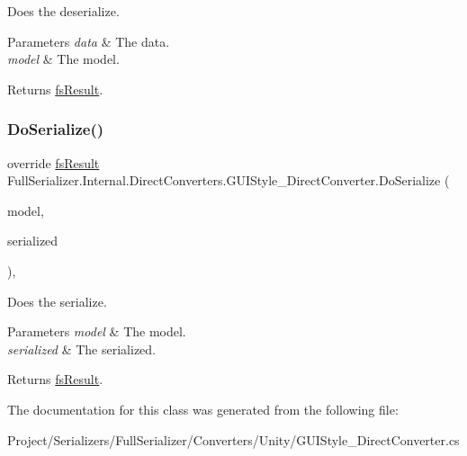 Does the deserialize. 


\begin{DoxyParams}{Parameters}
{\em data} & The data.\\
\hline
{\em model} & The model.\\
\hline
\end{DoxyParams}
\begin{DoxyReturn}{Returns}
\hyperlink{struct_full_serializer_1_1fs_result}{fs\+Result}.
\end{DoxyReturn}
\mbox{\label{class_full_serializer_1_1_internal_1_1_direct_converters_1_1_g_u_i_style___direct_converter_aad30e70d6777a78e62406c4072e45eac}} 
\subsubsection{\texorpdfstring{Do\+Serialize()}{DoSerialize()}}
{\footnotesize\ttfamily override \hyperlink{struct_full_serializer_1_1fs_result}{fs\+Result} Full\+Serializer.\+Internal.\+Direct\+Converters.\+G\+U\+I\+Style\+\_\+\+Direct\+Converter.\+Do\+Serialize (\begin{DoxyParamCaption}\item[{G\+U\+I\+Style}]{model,  }\item[{Dictionary$<$ string, \hyperlink{class_full_serializer_1_1fs_data}{fs\+Data} $>$}]{serialized }\end{DoxyParamCaption})\hspace{0.3cm}{\ttfamily [inline]}, {\ttfamily [protected]}}



Does the serialize. 


\begin{DoxyParams}{Parameters}
{\em model} & The model.\\
\hline
{\em serialized} & The serialized.\\
\hline
\end{DoxyParams}
\begin{DoxyReturn}{Returns}
\hyperlink{struct_full_serializer_1_1fs_result}{fs\+Result}.
\end{DoxyReturn}


The documentation for this class was generated from the following file\+:\begin{DoxyCompactItemize}
\item 
Project/\+Serializers/\+Full\+Serializer/\+Converters/\+Unity/G\+U\+I\+Style\+\_\+\+Direct\+Converter.\+cs\end{DoxyCompactItemize}
